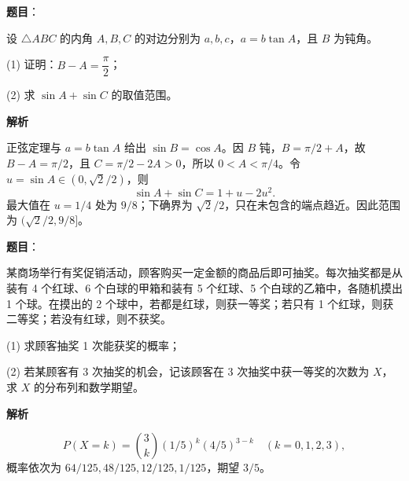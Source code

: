 \begin{answer}

\textbf{题目}：

设 \(\triangle ABC\) 的内角 \(A,B,C\) 的对边分别为 \(a,b,c\)，\(a=b\tan A\)，且 \(B\) 为钝角。

(1) 证明：\(B-A=\dfrac{\pi}{2}\)；

(2) 求 \(\sin A+\sin C\) 的取值范围。

\textbf{解析}

正弦定理与 \(a=b\tan A\) 给出 \(\sin B=\cos A\)。因 \(B\) 钝，\(B=\pi/2+A\)，故 \(B-A=\pi/2\)，且 \(C=\pi/2-2A>0\)，所以 \(0<A<\pi/4\)。令 \(u=\sin A\in(0,\sqrt2/2)\)，则
\nopagebreak[4]
\[
\sin A+\sin C=1+u-2u^2.
\]
最大值在 \(u=1/4\) 处为 \(9/8\)；下确界为 \(\sqrt2/2\)，只在未包含的端点趋近。因此范围为 \((\sqrt2/2,9/8]\)。


\gkanswer{答案（2）：\((\sin A+\sin C)\in(\dfrac{\sqrt2}{2},\dfrac98]\)。}

\end{answer}
\begin{answer}

\textbf{题目}：

某商场举行有奖促销活动，顾客购买一定金额的商品后即可抽奖。每次抽奖都是从装有 4 个红球、6 个白球的甲箱和装有 5 个红球、5 个白球的乙箱中，各随机摸出 1 个球。在摸出的 2 个球中，若都是红球，则获一等奖；若只有 1 个红球，则获二等奖；若没有红球，则不获奖。

(1) 求顾客抽奖 1 次能获奖的概率；

(2) 若某顾客有 3 次抽奖的机会，记该顾客在 3 次抽奖中获一等奖的次数为 \(X\)，求 \(X\) 的分布列和数学期望。

\textbf{解析}

\nopagebreak[4]
\[
P(X=k)=\binom3k(1/5)^k(4/5)^{3-k}\quad(k=0,1,2,3),
\]
概率依次为 \(64/125,48/125,12/125,1/125\)，期望 \(3/5\)。



\end{answer}
